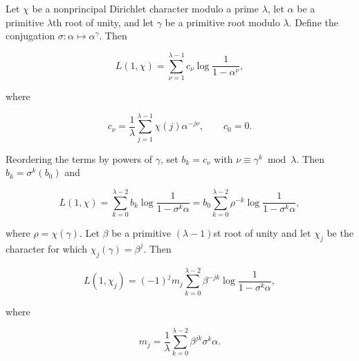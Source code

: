 Let $\chi$ be a nonprincipal Dirichlet character modulo a prime $\lambda$, let $\alpha$ be a primitive $\lambda$th root of unity, and let $\gamma$ be a primitive root modulo $\lambda$. Define the conjugation $\sigma : \alpha \mapsto \alpha^\gamma$. Then

$$L(1, \chi) = \sum_{\nu=1}^{\lambda-1} c_\nu \log \frac{1}{1-\alpha^\nu},$$

where

$$c_\nu = \frac{1}{\lambda} \sum_{j=1}^{\lambda-1} \chi(j) \alpha^{-j\nu}, \qquad c_0 = 0.$$

Reordering the terms by powers of $\gamma$, set $b_k = c_\nu$ with $\nu \equiv \gamma^k \bmod \lambda$. Then $b_k = \sigma^k(b_0)$ and

$$L(1, \chi) = \sum_{k=0}^{\lambda-2} b_k \log \frac{1}{1-\sigma^k \alpha} = b_0 \sum_{k=0}^{\lambda-2} \rho^{-k} \log \frac{1}{1-\sigma^k \alpha},$$

where $\rho = \chi(\gamma)$. Let $\beta$ be a primitive $(\lambda-1)$st root of unity and let $\chi_j$ be the character for which $\chi_j(\gamma) = \beta^j$. Then

$$L(1, \chi_j) = (-1)^j m_j \sum_{k=0}^{\lambda-2} \beta^{-jk} \log \frac{1}{1-\sigma^k \alpha},$$

where

$$m_j = \frac{1}{\lambda} \sum_{k=0}^{\lambda-2} \beta^{jk} \sigma^k \alpha.$$
